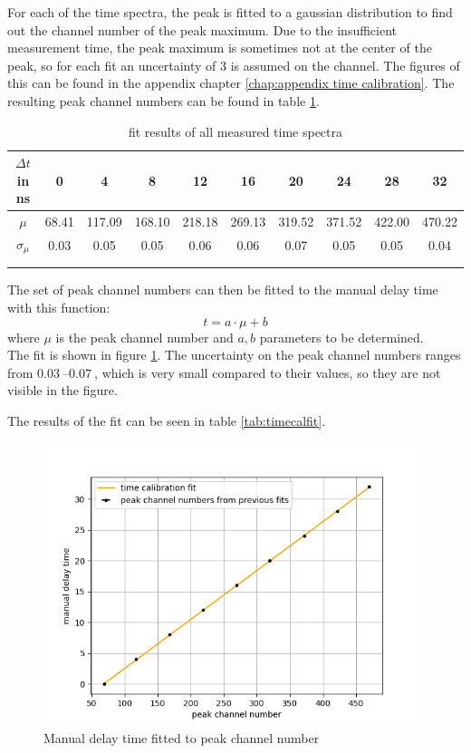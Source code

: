 For each of the time spectra, the peak is fitted to a gaussian distribution to find out the channel number of the peak maximum. Due to the insufficient measurement time, the peak maximum is sometimes not at the center of the peak, so for each fit an uncertainty of 3 is assumed on the channel. The figures of this can be found in the appendix chapter \ref{chap:appendix time calibration}. The resulting peak channel numbers can be found in table \ref{tab:mu table}.\\
\begin{table}[]
    \centering
    \caption{fit results of all measured time spectra}
    \begin{tabular}{cccccccccc}
      $\Delta t$ in ns & 0 & 4 & 8 & 12 & 16 &20 & 24 & 28 & 32 \\
    \hline
    $\mu$ & 68.41 & 117.09 & 168.10 & 218.18 & 269.13
& 319.52 &371.52 & 422.00 & 470.22\\
    $\sigma_\mu$ &0.03& 0.05 &0.05 &0.06& 0.06& 0.07&
 0.05& 0.05 &0.04 \\\hline\\\\
    \end{tabular}
    \label{tab:mu table}
\end{table}{}

The set of peak channel numbers can then be fitted to the manual delay time with this function: 
$$ t = a\cdot\mu +b$$
where $\mu$ is the peak channel number and $a,b$ parameters to be determined. \\The fit is shown in figure \ref{fig:timecalfit}. The uncertainty on the peak channel numbers ranges from $\SIrange{0.03}{0.07}{}$, which is very small compared to their values, so they are not visible in the figure.

The results of the fit can be seen in table \ref{tab:timecalfit}.

\begin{figure}[]
    \centering
    \includegraphics[width=110mm,scale=0.5]{Positronium/include/timecalfit.png}
    \caption{Manual delay time fitted to peak channel number} 
    \label{fig:timecalfit}
\end{figure}

